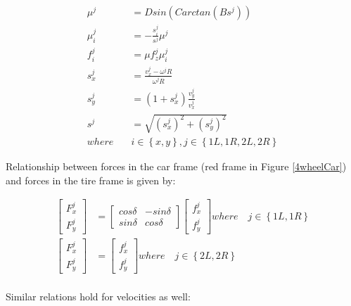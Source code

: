 \documentclass[paper=a4, fontsize=11pt]{scrartcl} %
\numberwithin{equation}{section} %
\numberwithin{figure}{section} %
\numberwithin{table}{section} %
\begin{document}
\begin{align}
\mu^j & =Dsin(Carctan(Bs^j)) \label{4wheelPacejkaEq1}  \\
\mu_i^j & = -\frac{s_i^j}{s^j}\mu^j   \\
f_i^j & = \mu f_{z}^j \mu_i^j \label{lateralLongitudinal}  \\
s_x^j & = \frac{v_x^j - \omega^jR}{\omega^jR}   \\
s_y^j & = \left( 1 + s_x^j\right) \frac{v_y^j}{v_x^j}  \\ 
s^j & = \sqrt{ (s_x^j)^2 + (s_y^j)^2 }   \\
where \quad &  i \in\left\{ {x, y}\right\}, j \in \left\{ {1L,1R,2L, 2R}\right\} \label{4wheelPacejkaEq6}
\end{align}

Relationship between forces in the car frame (red frame in Figure \ref{4wheelCar}) and forces in the tire frame is given by:

\begin{align}
\begin{bmatrix}
F^j_x  \label{forcesConversion1}\\
F^j_y
\end{bmatrix} & = \begin{bmatrix}
cos\delta & -sin\delta \\
sin\delta & cos\delta
\end{bmatrix} \begin{bmatrix}
f^j_x \\
f^j_y
\end{bmatrix}
where  \quad j \in \left\{ {1L,1R}\right\} \\
\begin{bmatrix}
F^j_x \\
F^j_y
\end{bmatrix} & = \begin{bmatrix}
f^j_x \\
f^j_y
\end{bmatrix}
where  \quad j \in \left\{ {2L,2R}\right\} \label{forcesConversion3} \\
\end{align}

Similar relations hold for velocities as well:
\end{document}
